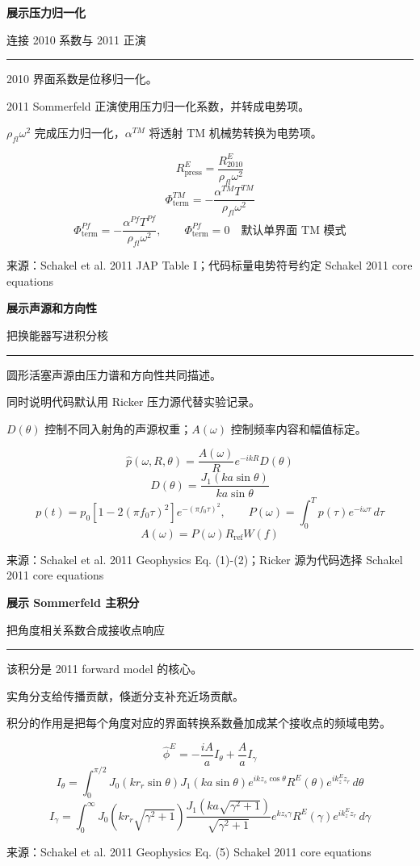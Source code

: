\documentclass[12pt]{article}
\newcounter{slide}
\newcommand{\TitleFont}{\fontsize{32}{38}\selectfont\bfseries}
\newcommand{\TagFont}{\fontsize{16}{20}\selectfont}
\newcommand{\BodyFont}{\fontsize{18}{24}\selectfont}
\newcommand{\SmallFont}{\fontsize{16}{21}\selectfont}
\newcommand{\FootFont}{\fontsize{12}{14}\selectfont}
\newcommand{\FormulaFont}{\fontsize{18}{23}\selectfont}
\newcommand{\src}[1]{\vfill{\SmallFont\color{Grey}来源：#1}}
\newcommand{\one}[1]{{\BodyFont\color{Ink}#1}}
\newcommand{\explain}[1]{{\SmallFont\color{Grey}#1}}
\newenvironment{slide}[2]{%
  \clearpage
  \stepcounter{slide}
  \thispagestyle{empty}
  {\TitleFont\color{Ink}#1}\par
  \vspace{0.05in}
  {\TagFont\color{Blue}#2}\par
  \vspace{0.11in}
  {\color{Blue}\rule{\textwidth}{1.6pt}}\par
  \vspace{0.22in}
}{%
  \vfill
  {\FootFont\color{Grey}Schakel 2011 core equations}
  \hfill
  {\FootFont\color{Grey}\theslide}
}
\newcommand{\twocol}[2]{%
  \begin{minipage}[t]{0.32\textwidth}
  #1
  \end{minipage}\hfill
  \begin{minipage}[t]{0.63\textwidth}
  #2
  \end{minipage}
}
\begin{document}
\begin{slide}{展示压力归一化}{连接 2010 系数与 2011 正演}
\twocol{
\one{2010 界面系数是位移归一化。}\par
\vspace{0.20in}
\one{2011 Sommerfeld 正演使用压力归一化系数，并转成电势项。}\par
\vspace{0.20in}
\explain{$\rho_{fl}\omega^2$ 完成压力归一化，$\alpha^{TM}$ 将透射 TM 机械势转换为电势项。}
}{
{\FormulaFont
\[
R^E_{\mathrm{press}}
=
\frac{R^E_{2010}}{\rho_{fl}\omega^2}
\]
\[
\Phi^{TM}_{\mathrm{term}}
=
-
\frac{\alpha^{TM}T^{TM}}
{\rho_{fl}\omega^2}
\]
\[
\Phi^{Pf}_{\mathrm{term}}
=
-
\frac{\alpha^{Pf}T^{Pf}}
{\rho_{fl}\omega^2},
\qquad
\Phi^{Pf}_{\mathrm{term}}=0
\quad
\text{默认单界面 TM 模式}
\]
}
}
\src{Schakel et al. 2011 JAP Table I；代码标量电势符号约定}
\end{slide}

\begin{slide}{展示声源和方向性}{把换能器写进积分核}
\twocol{
\one{圆形活塞声源由压力谱和方向性共同描述。}\par
\vspace{0.20in}
\one{同时说明代码默认用 Ricker 压力源代替实验记录。}\par
\vspace{0.20in}
\explain{$D(\theta)$ 控制不同入射角的声源权重；$A(\omega)$ 控制频率内容和幅值标定。}
}{
{\FormulaFont
\[
\hat{p}(\omega,R,\theta)
=
\frac{A(\omega)}{R}e^{-ikR}D(\theta)
\]
\[
D(\theta)=
\frac{J_1(ka\sin\theta)}
{ka\sin\theta}
\]
\[
p(t)=p_0\left[1-2(\pi f_0\tau)^2\right]e^{-(\pi f_0\tau)^2},
\qquad
P(\omega)=\int_0^T p(\tau)e^{-i\omega\tau}\,d\tau
\]
\[
A(\omega)=P(\omega)R_{\mathrm{ref}}W(f)
\]
}
}
\src{Schakel et al. 2011 Geophysics Eq. (1)-(2)；Ricker 源为代码选择}
\end{slide}

\begin{slide}{展示 Sommerfeld 主积分}{把角度相关系数合成接收点响应}
\twocol{
\one{该积分是 2011 forward model 的核心。}\par
\vspace{0.20in}
\one{实角分支给传播贡献，倏逝分支补充近场贡献。}\par
\vspace{0.20in}
\explain{积分的作用是把每个角度对应的界面转换系数叠加成某个接收点的频域电势。}
}{
{\FormulaFont
\[
\hat{\phi}^{E}
=
-\frac{iA}{a}I_{\theta}
+\frac{A}{a}I_{\gamma}
\]
\[
I_{\theta}=
\int_0^{\pi/2}
J_0(kr_r\sin\theta)J_1(ka\sin\theta)
e^{ikz_s\cos\theta}
R^E(\theta)e^{ik_z^Ez_r}\,d\theta
\]
\[
I_{\gamma}=
\int_0^\infty
J_0(kr_r\sqrt{\gamma^2+1})
\frac{J_1(ka\sqrt{\gamma^2+1})}{\sqrt{\gamma^2+1}}
e^{kz_s\gamma}R^E(\gamma)e^{ik_z^Ez_r}\,d\gamma
\]
}
}
\src{Schakel et al. 2011 Geophysics Eq. (5)}
\end{slide}
\end{document}
